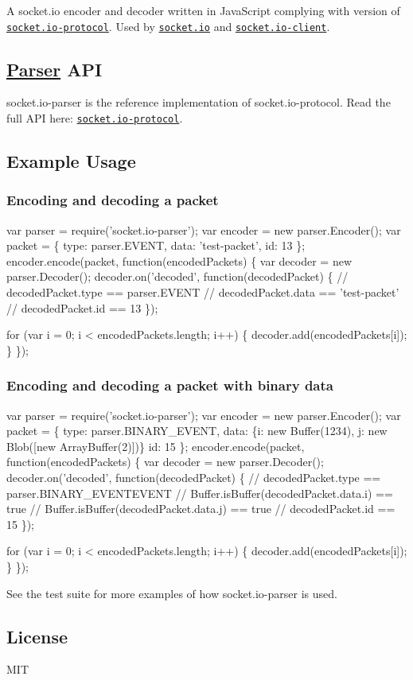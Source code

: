 \href{http://travis-ci.org/socketio/socket.io-parser}{\tt } \href{http://badge.fury.io/js/socket.io-parser}{\tt }

A socket.\+io encoder and decoder written in Java\+Script complying with version {} of \href{https://github.com/socketio/socket.io-protocol}{\tt socket.\+io-\/protocol}. Used by \href{https://github.com/automattic/socket.io}{\tt socket.\+io} and \href{https://github.com/automattic/socket.io-client}{\tt socket.\+io-\/client}.

\subsection*{\mbox{\hyperlink{class_parser}{Parser}} A\+PI}

socket.\+io-\/parser is the reference implementation of socket.\+io-\/protocol. Read the full A\+PI here\+: \href{https://github.com/learnboost/socket.io-protocol}{\tt socket.\+io-\/protocol}.

\subsection*{Example Usage}

\subsubsection*{Encoding and decoding a packet}


\begin{DoxyCode}
var parser = require('socket.io-parser');
var encoder = new parser.Encoder();
var packet = \{
  type: parser.EVENT,
  data: 'test-packet',
  id: 13
\};
encoder.encode(packet, function(encodedPackets) \{
  var decoder = new parser.Decoder();
  decoder.on('decoded', function(decodedPacket) \{
    // decodedPacket.type == parser.EVENT
    // decodedPacket.data == 'test-packet'
    // decodedPacket.id == 13
  \});

  for (var i = 0; i < encodedPackets.length; i++) \{
    decoder.add(encodedPackets[i]);
  \}
\});
\end{DoxyCode}


\subsubsection*{Encoding and decoding a packet with binary data}


\begin{DoxyCode}
var parser = require('socket.io-parser');
var encoder = new parser.Encoder();
var packet = \{
  type: parser.BINARY\_EVENT,
  data: \{i: new Buffer(1234), j: new Blob([new ArrayBuffer(2)])\}
  id: 15
\};
encoder.encode(packet, function(encodedPackets) \{
  var decoder = new parser.Decoder();
  decoder.on('decoded', function(decodedPacket) \{
    // decodedPacket.type == parser.BINARY\_EVENTEVENT
    // Buffer.isBuffer(decodedPacket.data.i) == true
    // Buffer.isBuffer(decodedPacket.data.j) == true
    // decodedPacket.id == 15
  \});

  for (var i = 0; i < encodedPackets.length; i++) \{
    decoder.add(encodedPackets[i]);
  \}
\});
\end{DoxyCode}
 See the test suite for more examples of how socket.\+io-\/parser is used.

\subsection*{License}

M\+IT 